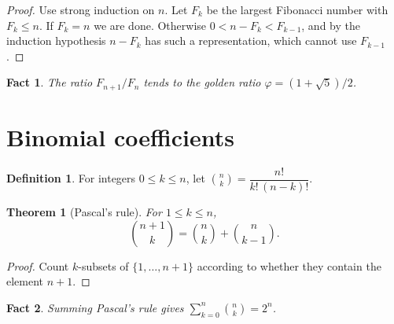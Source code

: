 \documentclass{article}
\newtheorem{theorem}{Theorem}[subsection]
\newtheorem{fact}{Fact}
\theoremstyle{definition}
\newtheorem{definition}{Definition}[section]
\numberwithin{equation}{section}
\begin{document}
\begin{proof}
Use strong induction on $n$. Let $F_k$ be the largest Fibonacci number with
$F_k \le n$. If $F_k = n$ we are done. Otherwise $0 < n - F_k < F_{k-1}$,
and by the induction hypothesis $n - F_k$ has such a representation, which
cannot use $F_{k-1}$.
\end{proof}

\begin{fact}
The ratio $F_{n+1}/F_n$ tends to the golden ratio
$\varphi = (1 + \sqrt5)/2$.
\end{fact}

\section{Binomial coefficients}

\begin{definition}
For integers $0 \le k \le n$, let
$\binom{n}{k} = \dfrac{n!}{k!\,(n-k)!}$.
\end{definition}

\begin{theorem}[Pascal's rule]
For $1 \le k \le n$,
\begin{equation}
  \binom{n+1}{k} = \binom{n}{k} + \binom{n}{k-1}.
\end{equation}
\end{theorem}

\begin{proof}
Count $k$-subsets of $\{1, \dots, n+1\}$ according to whether they contain
the element $n+1$.
\end{proof}

\begin{fact}
Summing Pascal's rule gives $\sum_{k=0}^{n} \binom{n}{k} = 2^n$.
\end{fact}
\end{document}
